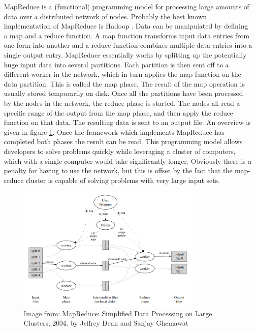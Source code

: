 MapReduce is a (functional) programming model for processing large amounts of
data over a distributed network of nodes. Probably the best known implementation
of MapReduce is Hadoop \cite{Hadoop}. Data can be manipulated by defining a map
and a reduce function. A map function transforms input data entries from one form into another
and a reduce function combines multiple data entries into a single output entry.
MapReduce essentially works by splitting up the potentially huge input data into
several partitions. Each partition is then sent off to a different worker in the
network, which in turn applies the map function on the data partition. This is
called the map phase. The result of the map operation is usually stored
temporarily on disk. Once all the partitions have been processed by the nodes in
the network, the reduce phase is started. The nodes all read a specific range of
the output from the map phase, and then apply the reduce function on that data.
The resulting data is sent to an output file. An overview is given in figure
\ref{fig:mapreduce}. Once the framework which implements MapReduce has completed
both phases the result can be read. This programming model allows developers to
solve problems quickly while leveraging a cluster of computers, which with a
single computer would take significantly longer. Obviously there is a penalty
for having to use the network, but this is offset by the fact that the
map-reduce cluster is capable of solving problems with very large input sets.

\begin{figure}[htb] 
\includegraphics[width=340px]{mapreduce.png} 
\caption{Image from: MapReduce: Simplified Data Processing on Large Clusters, 2004, by Jeffrey Dean and Sanjay Ghemawat} \label{fig:mapreduce} 
\end{figure}
